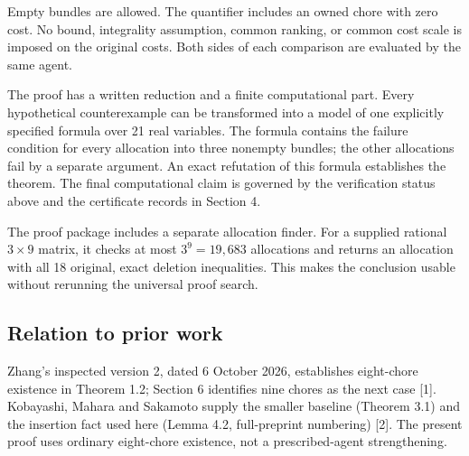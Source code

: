\documentclass[
  11pt,
]{article}
\newcounter{none} %
\begin{document}
Empty bundles are allowed. The quantifier includes an owned chore with
zero cost. No bound, integrality assumption, common ranking, or common
cost scale is imposed on the original costs. Both sides of each
comparison are evaluated by the same agent.

The proof has a written reduction and a finite computational part. Every
hypothetical counterexample can be transformed into a model of one
explicitly specified formula over 21 real variables. The formula
contains the failure condition for every allocation into three nonempty
bundles; the other allocations fail by a separate argument. An exact
refutation of this formula establishes the theorem. The final
computational claim is governed by the verification status above and the
certificate records in Section 4.

The proof package includes a separate allocation finder. For a supplied
rational \(3\times9\) matrix, it checks at most \(3^9=19,683\)
allocations and returns an allocation with all 18 original, exact
deletion inequalities. This makes the conclusion usable without
rerunning the universal proof search.

\subsection{Relation to prior work}\label{relation-to-prior-work}

Zhang's inspected version 2, dated 6 October 2026, establishes
eight-chore existence in Theorem 1.2; Section 6 identifies nine chores
as the next case {[}1{]}. Kobayashi, Mahara and Sakamoto supply the
smaller baseline (Theorem 3.1) and the insertion fact used here (Lemma
4.2, full-preprint numbering) {[}2{]}. The present proof uses ordinary
eight-chore existence, not a prescribed-agent strengthening.
\end{document}
